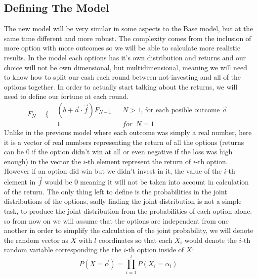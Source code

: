 \documentclass{article}
\begin{document}
	\subsection{Defining The Model}
	The new model will be very similar in some aspects to the Base model, but at the same time different and more robust. The complexity comes from the inclusion of more option with more outcomes so we will be able to calculate more realistic results. In the model each options has it's own distribution and returns and our choice will not be own dimensional, but multidimensional, meaning we will need to know how to split our cash each round between not-investing and all of the options together.\newline
	In order to actually start talking about the returns, we will need to define our fortune at each round.\\
	\begin{equation}
	\label{multi-dim-fortune}
	F_N = \Bigg\{
	\begin{aligned}
		&(b + \overrightarrow{a}\cdot \overrightarrow{f})F_{N-1} &&N > 1 \text{, for each posible outcome }\overrightarrow{a}\\
		&1 &&for \enspace N=1
	\end{aligned}
	\end{equation}
	Unlike in the previous model where each outcome was simply a real number, here it is a vector of real numbers representing the return of all the options (returns can be $0$ if the option didn't win at all or even negative if the loss was high enough)
	in the vector the $i$-th element represent the return of $i$-th option.
	\\
	However if an option did win but we didn't invest in it, the value of the $i$-th element in $\overrightarrow{f}$ would be $0$ meaning it will not be taken into account in calculation of the return.
	\newline
	The only thing left to define is the probabilities in the joint distributions of the options,
	sadly finding the joint distribution is not a simple task, to produce the joint distribution from the probabilities of each option alone. so from now on we will assume that the options are independent from one another in order to simplify the calculation of the joint probability, we will denote the random vector as $X$ with $l$ coordinates so that each $X_i$ would denote the $i$-th random variable corresponding the the $i$-th option inside of  $X$:
	\begin{equation}
		\label{mul-prob}
		P(X = \overrightarrow{\alpha}) = \prod_{i = 1}^l P(X_i = \alpha_i)
	\end{equation}
\end{document}
